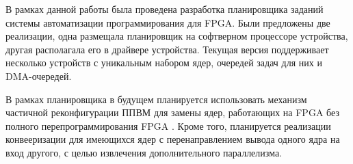 В рамках данной работы была проведена разработка планировщика заданий системы
автоматизации программирования для FPGA. Были предложены две реализации, одна
размещала планировщик на софтверном процессоре устройства, другая располагала
его в драйвере устройства. Текущая версия поддерживает несколько устройств с
уникальным набором ядер, очередей задач для них и DMA-очередей. 

В рамках
планировщика в будущем планируется использовать механизм частичной реконфигурации ППВМ для
замены ядер, работающих на FPGA без полного перепрограммирования FPGA
\cite{partial-reconfiguration-report}. Кроме того, планируется реализации
конвееризации для имеющихся ядер с перенаправлением вывода одного ядра на вход
другого, с целью извлечения дополнительного параллелизма.

